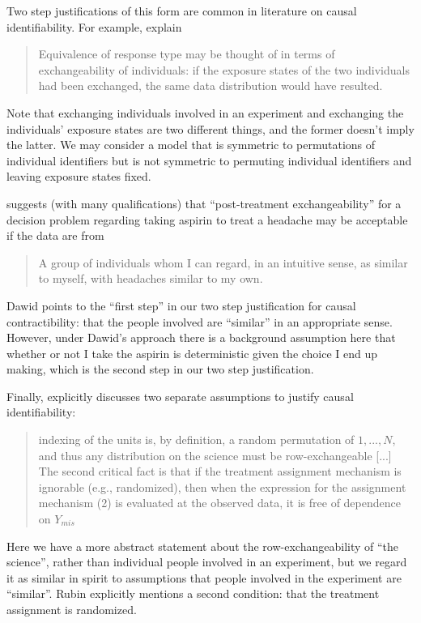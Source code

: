 Two step justifications of this form are common in literature on causal identifiability. For example, \citet{greenland_identifiability_1986} explain

\begin{quote}
    Equivalence of response type may be thought of in terms of exchangeability of individuals: if the exposure states of the two individuals had been exchanged, the same data distribution would have resulted.
\end{quote}

Note that exchanging individuals involved in an experiment and exchanging the individuals' exposure states are two different things, and the former doesn't imply the latter. We may consider a model that is symmetric to permutations of individual identifiers but is not symmetric to permuting individual identifiers and leaving exposure states fixed.

\citet{dawid_decision-theoretic_2020} suggests (with many qualifications) that ``post-treatment exchangeability'' for a decision problem regarding taking aspirin to treat a headache may be acceptable if the data are from

\begin{quote}
    A group of individuals whom I can regard, in an intuitive sense, as similar to myself, with headaches similar to my own.
\end{quote}

Dawid points to the ``first step'' in our two step justification for causal contractibility: that the people involved are ``similar'' in an appropriate sense. However, under Dawid's approach there is a background assumption here that whether or not I take the aspirin is deterministic given the choice I end up making, which is the second step in our two step justification.

Finally, \citet{rubin_causal_2005} explicitly discusses two separate assumptions to justify causal identifiability:

\begin{quote}
    indexing of the units is, by definition, a random permutation of $1,..., N$, and thus any distribution on the science must be row-exchangeable [...] The second critical fact is that if the treatment assignment mechanism is ignorable (e.g., randomized), then when the expression for the assignment mechanism (2) is evaluated at the observed data, it is free of dependence on $Y_{mis}$
\end{quote}

Here we have a more abstract statement about the row-exchangeability of ``the science'', rather than individual people involved in an experiment, but we regard it as similar in spirit to assumptions that people involved in the experiment are ``similar''. Rubin explicitly mentions a second condition: that the treatment assignment is randomized.

